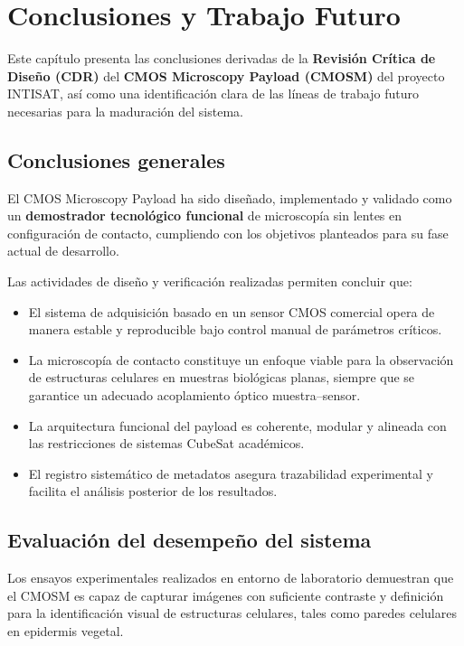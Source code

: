 \chapter{Conclusiones y Trabajo Futuro}
\label{ch:conclusiones}

Este capítulo presenta las conclusiones derivadas de la \textbf{Revisión Crítica
de Diseño (CDR)} del \textbf{CMOS Microscopy Payload (CMOSM)} del proyecto
INTISAT, así como una identificación clara de las líneas de trabajo futuro
necesarias para la maduración del sistema.

\section{Conclusiones generales}

El CMOS Microscopy Payload ha sido diseñado, implementado y validado como un
\textbf{demostrador tecnológico funcional} de microscopía sin lentes en
configuración de contacto, cumpliendo con los objetivos planteados para su fase
actual de desarrollo.

Las actividades de diseño y verificación realizadas permiten concluir que:

\begin{itemize}
    \item El sistema de adquisición basado en un sensor CMOS comercial opera de
    manera estable y reproducible bajo control manual de parámetros críticos.
    \item La microscopía de contacto constituye un enfoque viable para la
    observación de estructuras celulares en muestras biológicas planas, siempre
    que se garantice un adecuado acoplamiento óptico muestra--sensor.
    \item La arquitectura funcional del payload es coherente, modular y alineada
    con las restricciones de sistemas CubeSat académicos.
    \item El registro sistemático de metadatos asegura trazabilidad experimental
    y facilita el análisis posterior de los resultados.
\end{itemize}

\section{Evaluación del desempeño del sistema}

Los ensayos experimentales realizados en entorno de laboratorio demuestran que el
CMOSM es capaz de capturar imágenes con suficiente contraste y definición para la
identificación visual de estructuras celulares, tales como paredes celulares en
epidermis vegetal.

